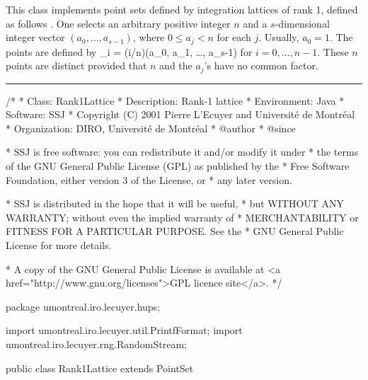 
This class implements point sets defined by integration
lattices of rank 1, defined as follows \cite{vSLO94a}.
One selects an arbitrary positive integer $n$ and a $s$-dimensional
integer vector $(a_0,\dots,a_{s-1})$, where $0 \le a_j < n$ for each $j$.
Usually, $a_0=1$.  The points are defined by
\eq
  _i = (i/n)(a_0, a_1, \ldots, a_{s-1}) 
\endeq
for $i=0,\dots,n-1$.
These $n$ points are distinct provided that $n$ and the $a_j$'s have
no common factor.


\bigskip\hrule\bigskip

\begin{code}
\begin{hide}
/*
 * Class:        Rank1Lattice
 * Description:  Rank-1 lattice
 * Environment:  Java
 * Software:     SSJ 
 * Copyright (C) 2001  Pierre L'Ecuyer and Université de Montréal
 * Organization: DIRO, Université de Montréal
 * @author       
 * @since

 * SSJ is free software: you can redistribute it and/or modify it under
 * the terms of the GNU General Public License (GPL) as published by the
 * Free Software Foundation, either version 3 of the License, or
 * any later version.

 * SSJ is distributed in the hope that it will be useful,
 * but WITHOUT ANY WARRANTY; without even the implied warranty of
 * MERCHANTABILITY or FITNESS FOR A PARTICULAR PURPOSE.  See the
 * GNU General Public License for more details.

 * A copy of the GNU General Public License is available at
   <a href="http://www.gnu.org/licenses">GPL licence site</a>.
 */
\end{hide}
package umontreal.iro.lecuyer.hups;\begin{hide}
import umontreal.iro.lecuyer.util.PrintfFormat;
import umontreal.iro.lecuyer.rng.RandomStream;
\end{hide}

public class Rank1Lattice extends PointSet \begin{hide} {

   protected int[] genAs;          // Lattice generator:  a[i]
   protected double[] v;           // Lattice vector:  v[i] = a[i]/n
   protected double normFactor;    // 1/n.
   protected double[] shift;       // Random shift, initially null.

\end{hide}
\end{code}

